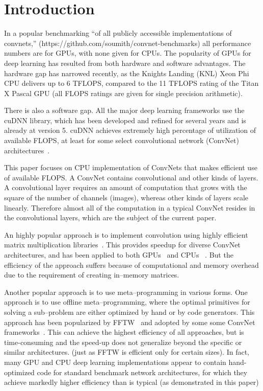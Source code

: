 \section{Introduction}

  In a popular benchmarking ``of all publicly accessible
  implementations of convnets,''
  (https://github.com/soumith/convnet-benchmarks) all performance
  numbers are for GPUs, with none given for CPUs.  The popularity of
  GPUs for deep learning has resulted from both hardware and software
  advantages.  The hardware gap has narrowed recently, as the Knights
  Landing (KNL) Xeon Phi CPU delivers up to 6 TFLOPS, compared to the
  11 TFLOPS rating of the Titan X Pascal GPU (all FLOPS ratings are
  given for single precision arithmetic).

  There is also a software gap.  All the major deep learning
  frameworks use the cuDNN library, which has been developed and
  refined for several years and is already at version 5.  cuDNN
  achieves extremely high percentage of utilization of available
  FLOPS, at least for some select convolutional network (ConvNet)
  architectures~\cite{imagenetwinners}.

  This paper focuses on CPU implementation of ConvNets that makes
  efficient use of available FLOPS.  A ConvNet contains convolutional
  and other kinds of layers.  A convolutional layer requires an amount
  of computation that grows with the square of the number of channels
  (images), whereas other kinds of layers scale linearly.  Therefore
  almost all of the computation in a typical ConvNet resides in the
  convolutional layers, which are the subject of the current paper.

  An highly popular approach is to implement convolution using highly
  efficient matrix multiplication
  libraries~\cite{chellapilla2006high}.  This provides speedup for
  diverse ConvNet architectures, and has been applied to both
  GPUs~\cite{chetlur2014cudnn,neonnervana} and CPUs
  ~\cite{hadjis2015shallow}.  But the efficiency of the approach
  suffers because of computational and memory overhead due to the
  requirement of creating in--memory matrices.

  Another popular approach is to use meta--programming in various
  forms.  One approach is to use offline meta--programming, where the
  optimal primitives for solving a sub--problem are either optimized
  by hand or by code generators.  This approach has been popularized
  by FFTW~\cite{frigo1998fftw,frigo1999fftw} and adopted by some some
  ConvNet frameworks~\cite{klockner2012pycuda,nervanagpu}.  This can
  achieve the highest efficiency of all approaches, but is
  time-consuming and the speed-up does not generalize beyond the
  specific or similar architectures.  (just as FFTW is efficient only
  for certain sizes).  In fact, many GPU and CPU deep learning
  implementations appear to contain hand-optimized code for standard
  benchmark network architectures, for which they achieve markedly
  higher efficiency than is typical (as demonstrated in this paper)

